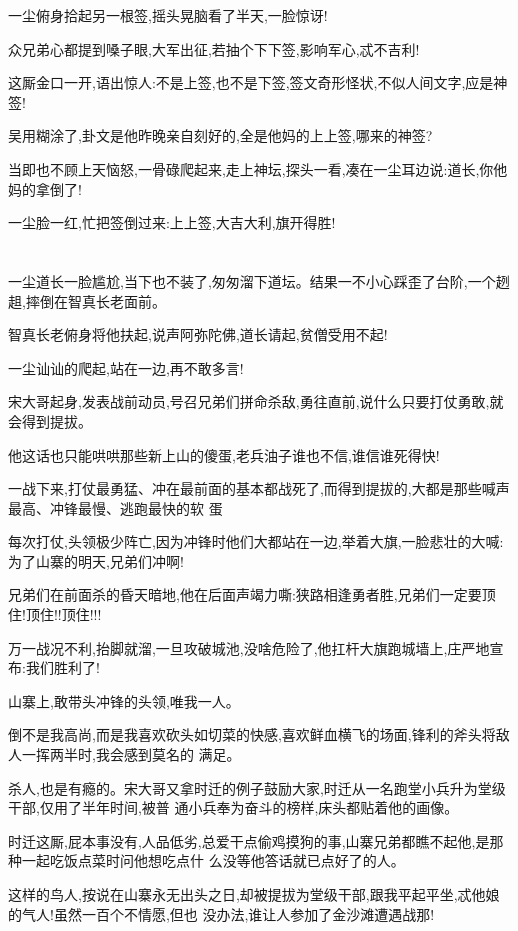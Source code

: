 ﻿\documentclass[12pt]{article}
\begin{document}
一尘俯身拾起另一根签,摇头晃脑看了半天,一脸惊讶!

众兄弟心都提到嗓子眼,大军出征,若抽个下下签,影响军心,忒不吉利!

这厮金口一开,语出惊人:不是上签,也不是下签,签文奇形怪状,不似人间文字,应是神签!

吴用糊涂了,卦文是他昨晚亲自刻好的,全是他妈的上上签,哪来的神签?

当即也不顾上天恼怒,一骨碌爬起来,走上神坛,探头一看,凑在一尘耳边说:道长,你他妈的拿倒了!

一尘脸一红,忙把签倒过来:上上签,大吉大利,旗开得胜!
\section{}

一尘道长一脸尴尬,当下也不装了,匆匆溜下道坛。结果一不小心踩歪了台阶,一个趔趄,摔倒在智真长老面前。

智真长老俯身将他扶起,说声阿弥陀佛,道长请起,贫僧受用不起!

一尘讪讪的爬起,站在一边,再不敢多言!

宋大哥起身,发表战前动员,号召兄弟们拼命杀敌,勇往直前,说什么只要打仗勇敢,就会得到提拔。

他这话也只能哄哄那些新上山的傻蛋,老兵油子谁也不信,谁信谁死得快!

一战下来,打仗最勇猛、冲在最前面的基本都战死了,而得到提拔的,大都是那些喊声最高、冲锋最慢、逃跑最快的软
蛋

每次打仗,头领极少阵亡,因为冲锋时他们大都站在一边,举着大旗,一脸悲壮的大喊:为了山寨的明天,兄弟们冲啊!

兄弟们在前面杀的昏天暗地,他在后面声竭力嘶:狭路相逢勇者胜,兄弟们一定要顶住!顶住!!顶住!!!

万一战况不利,抬脚就溜,一旦攻破城池,没啥危险了,他扛杆大旗跑城墙上,庄严地宣布:我们胜利了!

山寨上,敢带头冲锋的头领,唯我一人。

倒不是我高尚,而是我喜欢砍头如切菜的快感,喜欢鲜血横飞的场面,锋利的斧头将敌人一挥两半时,我会感到莫名的
满足。

杀人,也是有瘾的。宋大哥又拿时迁的例子鼓励大家,时迁从一名跑堂小兵升为堂级干部,仅用了半年时间,被普
通小兵奉为奋斗的榜样,床头都贴着他的画像。

时迁这厮,屁本事没有,人品低劣,总爱干点偷鸡摸狗的事,山寨兄弟都瞧不起他,是那种一起吃饭点菜时问他想吃点什
么没等他答话就已点好了的人。

这样的鸟人,按说在山寨永无出头之日,却被提拔为堂级干部,跟我平起平坐,忒他娘的气人!虽然一百个不情愿,但也
没办法,谁让人参加了金沙滩遭遇战那!
\end{document}
